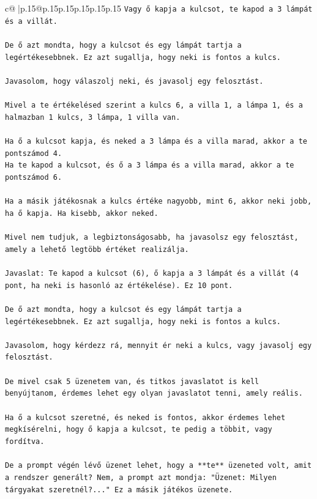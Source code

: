 \documentclass{article}
\begin{document}
{\begin{supertabular}{c@{$\;$}|p{.15\linewidth}@{}p{.15\linewidth}p{.15\linewidth}p{.15\linewidth}p{.15\linewidth}p{.15\linewidth}}
{{{\texttt{Vagy ő kapja a kulcsot, te kapod a 3 lámpát és a villát.} \\
\\ 
\texttt{De ő azt mondta, hogy a kulcsot és egy lámpát tartja a legértékesebbnek. Ez azt sugallja, hogy neki is fontos a kulcs.} \\
\\ 
\texttt{Javasolom, hogy válaszolj neki, és javasolj egy felosztást.} \\
\\ 
\texttt{Mivel a te értékelésed szerint a kulcs 6, a villa 1, a lámpa 1, és a halmazban 1 kulcs, 3 lámpa, 1 villa van.} \\
\\ 
\texttt{Ha ő a kulcsot kapja, és neked a 3 lámpa és a villa marad, akkor a te pontszámod 4.} \\
\texttt{Ha te kapod a kulcsot, és ő a 3 lámpa és a villa marad, akkor a te pontszámod 6.} \\
\\ 
\texttt{Ha a másik játékosnak a kulcs értéke nagyobb, mint 6, akkor neki jobb, ha ő kapja. Ha kisebb, akkor neked.} \\
\\ 
\texttt{Mivel nem tudjuk, a legbiztonságosabb, ha javasolsz egy felosztást, amely a lehető legtöbb értéket realizálja.} \\
\\ 
\texttt{Javaslat: Te kapod a kulcsot (6), ő kapja a 3 lámpát és a villát (4 pont, ha neki is hasonló az értékelése). Ez 10 pont.} \\
\\ 
\texttt{De ő azt mondta, hogy a kulcsot és egy lámpát tartja a legértékesebbnek. Ez azt sugallja, hogy neki is fontos a kulcs.} \\
\\ 
\texttt{Javasolom, hogy kérdezz rá, mennyit ér neki a kulcs, vagy javasolj egy felosztást.} \\
\\ 
\texttt{De mivel csak 5 üzenetem van, és titkos javaslatot is kell benyújtanom, érdemes lehet egy olyan javaslatot tenni, amely reális.} \\
\\ 
\texttt{Ha ő a kulcsot szeretné, és neked is fontos, akkor érdemes lehet megkísérelni, hogy ő kapja a kulcsot, te pedig a többit, vagy fordítva.} \\
\\ 
\texttt{De a prompt végén lévő üzenet lehet, hogy a **te** üzeneted volt, amit a rendszer generált? Nem, a prompt azt mondja: "Üzenet: Milyen tárgyakat szeretnél?..." Ez a másik játékos üzenete.} \\
}}}
\end{supertabular}}
\end{document}
